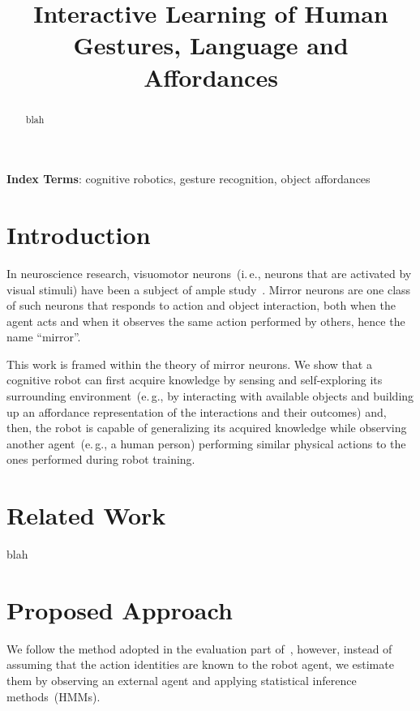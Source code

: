 \documentclass[a4paper]{article}
\title{Interactive Learning of Human Gestures, Language and Affordances}
\newcommand{\eg}{e.\,g.}
\newcommand{\ie}{i.\,e.}
\begin{document}
\maketitle
%
\begin{abstract} %
  blah
\end{abstract}
\noindent\textbf{Index Terms}: cognitive robotics, gesture recognition, object affordances

\section{Introduction}

In neuroscience research, visuomotor neurons~(\ie, neurons that are activated by visual stimuli) have been a subject of ample study~\cite{rizzolatti:2001:nrn}. Mirror neurons are one class of such neurons that responds to action and object interaction, both when the agent acts and when it observes the same action performed by others, hence the name ``mirror''.

This work is framed within the theory of mirror neurons. We show that a cognitive robot can first acquire knowledge by sensing and self-exploring its surrounding environment~(\eg, by interacting with available objects and building up an affordance representation of the interactions and their outcomes) and, then, the robot is capable of generalizing its acquired knowledge while observing another agent~(\eg, a human person) performing similar physical actions to the ones performed during robot training.

\section{Related Work}

blah

\section{Proposed Approach}

We follow the method adopted in the evaluation part of~\cite{salvi:2012:smcb}, however, instead of assuming that the action identities are known to the robot agent, we estimate them by observing an external agent and applying statistical inference methods~(\acp{HMM}).
\end{document}

